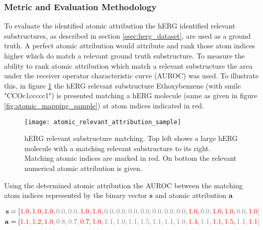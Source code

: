 \documentclass[../main.tex]{subfiles}
\begin{document}
\subsubsection{Metric and Evaluation Methodology} \label{sssec:evaluation_methodology}

To evaluate the identified atomic attribution the hERG identified relevant substructures, as described in section \ref{ssec:herg_dataset}, are used as a ground truth. A perfect atomic attribution would attribute and rank those atom indices higher which do match a relevant ground truth substructure. To measure the ability to rank atomic attribution which match a relevant substructure the area under the receiver operator characteristic curve (AUROC) was used. To illustrate this, in figure \ref{fig:atomic_relevant_attribution_sample} the hERG relevant substructure Ethoxybenzene (with smile "CCOc1ccccc1") is presented matching a hERG molecule (same as given in figure \ref{fig:atomic_mapping_sample}) at atom indices indicated in red. 

\begin{figure}[H]
    \centering
    \texttt{[image: atomic\_relevant\_attribution\_sample]}    
    \caption{hERG relevant substructure matching. Top left shows a large hERG molecule with a matching relevant substructure to its right. Matching atomic indices are marked in red. On bottom the relevant numerical atomic attribution is given.}
    \label{fig:atomic_relevant_attribution_sample}
\end{figure} 

Using the determined atomic attribution the AUROC between the matching atom indices represented by the binary vector $\mathbf{s}$ and atomic attribution $\mathbf{a}$

\begin{equation}
\nonumber
\begin{split}
    \mathbf{s} & = [\color{red}1.0, \color{red}1.0, \color{red}1.0, \color{gray}0.0, \color{gray}0.0, \color{red}1.0, \color{red}1.0, \color{gray}0.0, \color{gray}0.0, \color{gray}0.0, \color{gray}0.0, \color{gray}0.0, \color{gray}0.0, \color{gray}0.0, \color{red}1.0, \color{gray}0.0, \color{red}1.0, \color{red}1.0, \color{gray}0.0, \color{red}1.0\color{gray}] \\
    \mathbf{a} & = [\color{red}1.1, \color{red}1.2, \color{red}1.0, \color{gray}0.8, \color{gray}0.7, \color{red}0.7, \color{red}1.0, \color{gray}1.1, \color{gray}1.0, \color{gray}1.1, \color{gray}1.5, \color{gray}1.1, \color{gray}1.1, \color{gray}1.0, \color{red}1.4, \color{gray}1.1, \color{red}1.1, \color{red}1.5, \color{gray}1.1, \color{red}1.1\color{gray}]
\end{split}
\end{equation}
\end{document}
